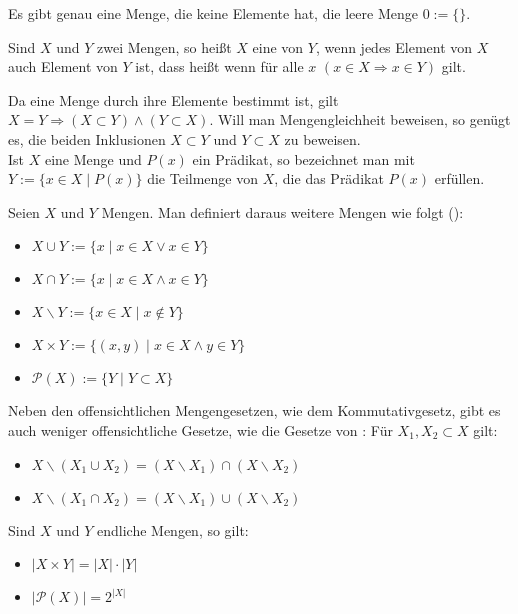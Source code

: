 \begin{example}
	Es gibt genau eine Menge, die keine Elemente hat, die leere Menge $0 := \{\}$.
\end{example}


\begin{definition}[Teilmenge]
	Sind $X$ und $Y$ zwei Mengen, so heißt $X$ eine  von 
	$Y$, wenn jedes Element von $X$ auch Element von $Y$ ist, dass heißt wenn für alle 
	$x$ $(x \in X \Rightarrow x \in Y)$ gilt.
\end{definition}

Da eine Menge durch ihre Elemente bestimmt ist, gilt $X = Y \Rightarrow (X \subset Y)\land
(Y \subset X)$. Will man Mengengleichheit beweisen, so genügt es, die beiden Inklusionen
$X \subset Y$ und $Y \subset X$ zu beweisen. \\


Ist $X$ eine Menge und $P(x)$ ein Prädikat, so bezeichnet man mit $Y:= \{x \in X \mid
P(x)\}$ die Teilmenge von $X$, die das Prädikat $P(x)$ erfüllen. \\

\begin{definition}[Mengenoperationen]
	Seien $X$ und $Y$ Mengen. Man definiert daraus 
	weitere Mengen wie folgt ():
	\begin{itemize}
		\item $X \cup Y := \{x \mid x \in X \lor x \in Y\}$
		\item $X \cap Y := \{x \mid x \in X \land x \in Y\}$
		\item $X \backslash Y := \{x \in X \mid x \notin Y\}$
		\item $X \times Y := \{(x,y) \mid x \in X \land y \in Y\}$
		\item $\mathcal P(X) := \{Y \mid Y \subset X\}$
	\end{itemize}
\end{definition}

Neben den offensichtlichen Mengengesetzen, wie dem Kommutativgesetz, gibt es auch weniger 
offensichtliche Gesetze, wie die Gesetze von : Für $X_1, X_2 \subset X$ gilt:
\begin{itemize}
	\item $X \backslash (X_1 \cup X_2) = (X \backslash X_1) \cap (X \backslash X_2)$
	\item $X \backslash (X_1 \cap X_2) = (X \backslash X_1) \cup (X \backslash X_2)$
\end{itemize}


Sind $X$ und $Y$ endliche Mengen, so gilt:
\begin{itemize}
	\item $|X \times Y| = |X| \cdot |Y|$
	\item $|\mathcal P(X)| = 2^{|X|}$
\end{itemize}